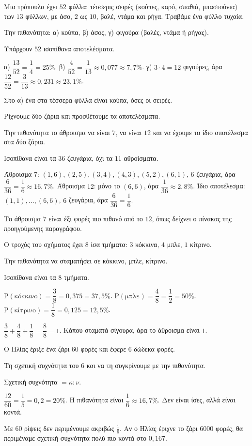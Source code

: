 \tixero Μια τράπουλα έχει $52$ φύλλα: τέσσερις σειρές (κούπες, καρό, σπαθιά, μπαστούνια) των $13$ φύλλων, με άσο, $2$ ως $10$, βαλέ, ντάμα και ρήγα. Τραβάμε ένα φύλλο τυχαία.\par
\tithelo Την πιθανότητα: α) κούπα, β) άσος, γ) φιγούρα (βαλές, ντάμα ή ρήγας).\par
\possindeo Υπάρχουν $52$ ισοπίθανα αποτελέσματα.\par
\apantisi α) $\dfrac{13}{52}=\dfrac{1}{4}=25\%$. β) $\dfrac{4}{52}=\dfrac{1}{13}\approx0{,}077\approx7{,}7\%$. γ) $3\cdot4=12$ φιγούρες, άρα $\dfrac{12}{52}=\dfrac{3}{13}\approx0{,}231\approx23{,}1\%$.\par
\elegxos Στο α) ένα στα τέσσερα φύλλα είναι κούπα, όσες οι σειρές.

\tixero Ρίχνουμε δύο ζάρια και προσθέτουμε τα αποτελέσματα.\par
\tithelo Την πιθανότητα το άθροισμα να είναι $7$, να είναι $12$ και να έχουμε το ίδιο αποτέλεσμα στα δύο ζάρια.\par
\possindeo Ισοπίθανα είναι τα $36$ ζευγάρια, όχι τα $11$ αθροίσματα.\par
\apantisi Άθροισμα $7$: $(1,6),(2,5),(3,4),(4,3),(5,2),(6,1)$, $6$ ζευγάρια, άρα $\dfrac{6}{36}=\dfrac{1}{6}\approx16{,}7\%$. Άθροισμα $12$: μόνο το $(6,6)$, άρα $\dfrac{1}{36}\approx2{,}8\%$. Ίδιο αποτέλεσμα: $(1,1),\dots,(6,6)$, $6$ ζευγάρια, άρα $\dfrac{6}{36}=\dfrac{1}{6}$.\par
\elegxos Το άθροισμα $7$ είναι έξι φορές πιο πιθανό από το $12$, όπως δείχνει ο πίνακας της προηγούμενης παραγράφου.

\tixero Ο τροχός του σχήματος έχει $8$ ίσα τμήματα: $3$ κόκκινα, $4$ μπλε, $1$ κίτρινο.\par
\tithelo Την πιθανότητα να σταματήσει σε κόκκινο, μπλε, κίτρινο.\par
\possindeo Ισοπίθανα είναι τα $8$ τμήματα.\par
\apantisi $\mathrm{Ρ}(\text{κόκκινο})=\dfrac{3}{8}=0{,}375=37{,}5\%$. $\mathrm{Ρ}(\text{μπλε})=\dfrac{4}{8}=\dfrac{1}{2}=50\%$. $\mathrm{Ρ}(\text{κίτρινο})=\dfrac{1}{8}=0{,}125=12{,}5\%$.\par
\elegxos $\dfrac{3}{8}+\dfrac{4}{8}+\dfrac{1}{8}=\dfrac{8}{8}=1$. Κάπου σταματά σίγουρα, άρα το άθροισμα είναι $1$.

\tixero Ο Ηλίας έριξε ένα ζάρι $60$ φορές και έφερε $6$ δώδεκα φορές.\par
\tithelo Τη σχετική συχνότητα του $6$ και να τη συγκρίνουμε με την πιθανότητα.\par
\possindeo Σχετική συχνότητα $=\kappa:\nu$.\par
\apantisi $\dfrac{12}{60}=\dfrac{1}{5}=0{,}2=20\%$. Η πιθανότητα είναι $\dfrac{1}{6}\approx16{,}7\%$. Δεν είναι ίσες, αλλά είναι κοντά.\par
\elegxos Με $60$ ρίψεις δεν περιμένουμε ακριβώς $\frac{1}{6}$. Αν ο Ηλίας έριχνε το ζάρι $6000$ φορές, θα περιμέναμε σχετική συχνότητα πολύ πιο κοντά στο $0{,}167$.

